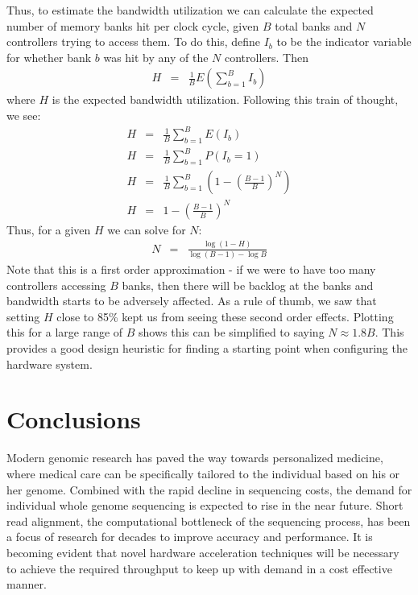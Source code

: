 \documentclass[11pt]{article}
\begin{document}
Thus, to estimate the bandwidth utilization we can calculate the expected number of memory banks hit per clock cycle, given $B$ total banks and $N$ controllers trying to access them. To do this, define $I_b$ to be the indicator variable for whether bank $b$ was hit by any of the $N$ controllers. Then
\begin{eqnarray*}
H&=&\frac{1}{B}E\left(\sum_{b=1}^{B} I_b\right)
\end{eqnarray*}
where $H$ is the expected bandwidth utilization. Following this train of thought, we see:
\begin{eqnarray*}
H&=&\frac{1}{B} \sum_{b=1}^{B} E(I_b) \\
H&=&\frac{1}{B} \sum_{b=1}^{B} P(I_b = 1) \\
H&=&\frac{1}{B} \sum_{b=1}^{B} \left(1-\left(\frac{B-1}{B}\right)^N\right) \\
H&=& 1-\left(\frac{B-1}{B}\right)^N
\end{eqnarray*}
Thus, for a given $H$ we can solve for $N$:
\begin{eqnarray*}
N&=&\frac{\log{(1-H)}}{\log{(B-1)}-\log{B}}
\end{eqnarray*}
Note that this is a first order approximation - if we were to have too many controllers accessing $B$ banks, then there will be backlog at the banks and bandwidth starts to be adversely affected. As a rule of thumb, we saw that setting $H$ close to 85\% kept us from seeing these second order effects. Plotting this for a large range of $B$ shows this can be simplified to saying $N \approx 1.8B$. This provides a good design heuristic for finding a starting point when configuring the hardware system.

\section{Conclusions}

Modern genomic research has paved the way towards personalized medicine, where medical care can be specifically tailored to the individual based on his or her genome.  Combined with the rapid decline in sequencing costs, the demand for individual whole genome sequencing is expected to rise in the near future.  Short read alignment, the computational bottleneck of the sequencing process, has been a focus of research for decades to improve accuracy and performance.  It is becoming evident that novel hardware acceleration techniques will be necessary to achieve the required throughput to keep up with demand in a cost effective manner.
\end{document}
